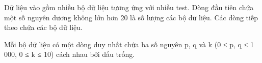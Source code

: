 Dữ liệu vào gồm nhiều bộ dữ liệu tương ứng với nhiều test. Dòng đầu tiên chứa một số nguyên dương không lớn hơn 20 là số lượng các bộ dữ liệu. Các dòng tiếp theo chứa các bộ dữ liệu.

Mỗi bộ dữ liệu có một dòng duy nhất chứa ba số nguyên p, q và k (0 ≤ p, q ≤ 1 000, 0 ≤ k ≤ 10) cách nhau bởi dấu trống.